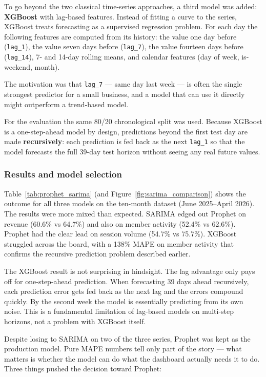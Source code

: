 \documentclass[12pt, a4paper]{report}
\begin{document}
To go beyond the two classical time-series approaches, a third model was added:
\textbf{XGBoost} with lag-based features. Instead of fitting a curve to the
series, XGBoost treats forecasting as a supervised regression problem. For each
day the following features are computed from its history: the value one day
before (\texttt{lag\_1}), the value seven days before (\texttt{lag\_7}), the
value fourteen days before (\texttt{lag\_14}), 7- and 14-day rolling means, and
calendar features (day of week, is-weekend, month).

The motivation was that \texttt{lag\_7} --- same day last week --- is often the
single strongest predictor for a small business, and a model that can use it
directly might outperform a trend-based model.

For the evaluation the same 80/20 chronological split was used. Because XGBoost
is a one-step-ahead model by design, predictions beyond the first test day are
made \textbf{recursively}: each prediction is fed back as the next
\texttt{lag\_1} so that the model forecasts the full 39-day test horizon without
seeing any real future values.

\subsubsection*{Results and model selection}

Table~\ref{tab:prophet_sarima} (and Figure~\ref{fig:sarima_comparison}) shows
the outcome for all three models on the ten-month dataset (June 2025--April 2026).
The results were more mixed than expected. SARIMA edged out Prophet on revenue
(60.6\% vs 64.7\%) and also on member activity (52.4\% vs 62.6\%). Prophet
had the clear lead on session volume (54.7\% vs 75.7\%). XGBoost struggled
across the board, with a 138\% MAPE on member activity that confirms the
recursive prediction problem described earlier.

The XGBoost result is not surprising in hindsight. The lag advantage only pays
off for one-step-ahead prediction. When forecasting 39 days ahead recursively,
each prediction error gets fed back as the next lag and the errors compound
quickly. By the second week the model is essentially predicting from its own
noise. This is a fundamental limitation of lag-based models on multi-step
horizons, not a problem with XGBoost itself.

Despite losing to SARIMA on two of the three series, Prophet was kept as the
production model. Pure MAPE numbers tell only part of the story --- what matters
is whether the model can do what the dashboard actually needs it to do. Three
things pushed the decision toward Prophet:
\end{document}
